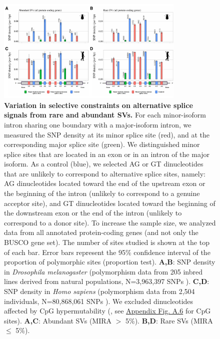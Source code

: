 \begin{figure}[t]   
    \centering                                                                                    
        \includegraphics[width=0.8\textwidth] {Figure5.pdf}                             
    \caption[Variation in selective constraints on alternative splice signals from rare and abundant SVs]{\textbf{Variation in selective constraints on alternative splice signals from rare and abundant SVs.}
For each minor-isoform intron sharing one boundary with a major-isoform intron, we measured the SNP density at its minor splice site (red), and at the corresponding major splice site (green). We distinguished minor splice sites that are located in an exon or in an intron of the major isoform. As a control (blue), we selected AG or GT dinucleotides that are unlikely to correspond to alternative splice sites, namely: AG dinucleotides located toward the end of the upstream exon or the beginning of the intron (unlikely to correspond to a genuine acceptor site), and GT dinucleotides located toward the beginning of the downstream exon or the end of the intron (unlikely to correspond to a donor site). To increase the sample size, we analyzed data from all annotated protein-coding genes (and not only the \acrshort{BUSCO} gene set). The number of sites studied is shown at the top of each bar. Error bars represent the 95\% confidence interval of the proportion of polymorphic sites (proportion test). \textbf{A,B}: SNP density in \textit{Drosophila melanogaster} (polymorphism data from 205 inbred lines derived from natural populations, N=3,963,397 SNPs \citep{huang_natural_2014, mackay_drosophila_2012}). \textbf{C,D}: SNP density in \textit{Homo sapiens} (polymorphism data from 2,504 individuals, N=80,868,061 SNPs \citep{auton_global_2015}). We excluded dinucleotides affected by \gls{CpG} hypermutability (, see \hyperref[supp_fig:AS6]{Appendix Fig. A.6} for \gls{CpG} sites). \textbf{A,C}: Abundant \acrshort{SV}s (MIRA $>$ 5\%). \textbf{B,D}: Rare \acrshort{SV}s (MIRA $\leq$ 5\%).\newline}
    \label{fig:AS5}
\end{figure}



